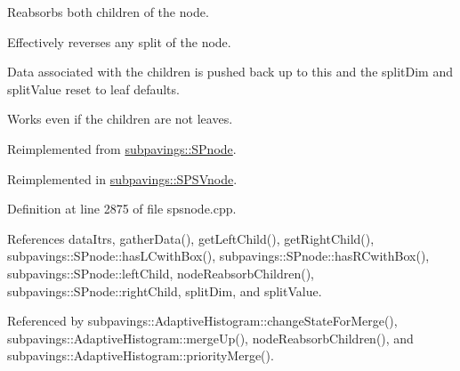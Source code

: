 \-Reabsorbs both children of the node. 

\-Effectively reverses any split of the node.

\-Data associated with the children is pushed back up to this and the split\-Dim and split\-Value reset to leaf defaults.

\-Works even if the children are not leaves. 

\-Reimplemented from \hyperlink{classsubpavings_1_1SPnode_ab92c1accdfd155898e63e26a112b8e36}{subpavings\-::\-S\-Pnode}.



\-Reimplemented in \hyperlink{classsubpavings_1_1SPSVnode_aed19a06dc479c2edc865243d2c131c30}{subpavings\-::\-S\-P\-S\-Vnode}.



\-Definition at line 2875 of file spsnode.\-cpp.



\-References data\-Itrs, gather\-Data(), get\-Left\-Child(), get\-Right\-Child(), subpavings\-::\-S\-Pnode\-::has\-L\-Cwith\-Box(), subpavings\-::\-S\-Pnode\-::has\-R\-Cwith\-Box(), subpavings\-::\-S\-Pnode\-::left\-Child, node\-Reabsorb\-Children(), subpavings\-::\-S\-Pnode\-::right\-Child, split\-Dim, and split\-Value.



\-Referenced by subpavings\-::\-Adaptive\-Histogram\-::change\-State\-For\-Merge(), subpavings\-::\-Adaptive\-Histogram\-::merge\-Up(), node\-Reabsorb\-Children(), and subpavings\-::\-Adaptive\-Histogram\-::priority\-Merge().


